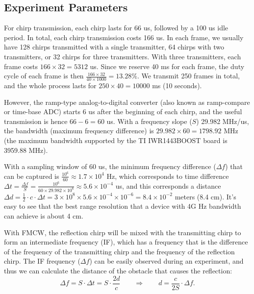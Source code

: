 \documentclass[11pt, oneside]{article}   	%
\begin{document}
\subsection{Experiment Parameters}

For chirp transmission, each chirp lasts for 66 us, followed by a 100 us idle period. In total, each chirp transmission costs 166 us. In each frame, we usually have 128 chirps transmitted with a single transmitter, 64 chirps with two transmitters, or 32 chirps for three transmitters. With three transmitters, each frame costs $166\times 32 = 5312$ us. Since we reserve 40 ms for each frame, the duty cycle of each frame is then $\frac{166\times 32}{40\times 1000} = 13.28\%.$ We transmit 250 frames in total, and the whole process lasts for $250 \times 40 = 10000$ ms (10 seconds).

However, the ramp-type analog-to-digital converter (also known as ramp-compare or time-base ADC) starts 6 us after the beginning of each chirp, and the useful transmission is hence $66 - 6 = 60$ us. With a frequency slope ($S$) 29.982 MHz/us, the bandwidth (maximum frequency difference) is $29.982 \times 60 = 1798.92$ MHz (the maximum bandwidth supported by the TI IWR1443BOOST board is 3959.88 MHz).

With a sampling window of 60 us, the minimum frequency difference ($\Delta f$) that can be captured is $\frac{10^6}{60} \approx 1.7\times 10^4$ Hz, which corresponds to time difference $\Delta t = \frac{\Delta f}{S} = \frac{10^6}{60\times 29.982 \times 10^6} \approx 5.6\times 10^{-4}$ us, and this corresponds a distance $\Delta d = \frac{1}{2}\cdot c\cdot \Delta t = 3\times 10^8 \times 5.6\times 10^{-4}\times 10^{-6} = 8.4\times 10^{-2}$ meters (8.4 cm). It's easy to see that the best range resolution that a device with 4G Hz bandwidth can achieve is about 4 cm.

With FMCW, the reflection chirp will be mixed with the transmitting chirp to form an intermediate frequency (IF), which has a frequency that is the difference of the frequency of the transmitting chirp and the frequency of the reflection chirp. The IF frequency ($\Delta f$) can be easily observed during an experiment, and thus we can calculate the distance of the obstacle that causes the reflection: 
$$\Delta f = S\cdot \Delta t = S\cdot \frac{2d}{c} \qquad \Rightarrow \qquad d = \frac{c}{2S}\cdot \Delta f.$$
\end{document}
